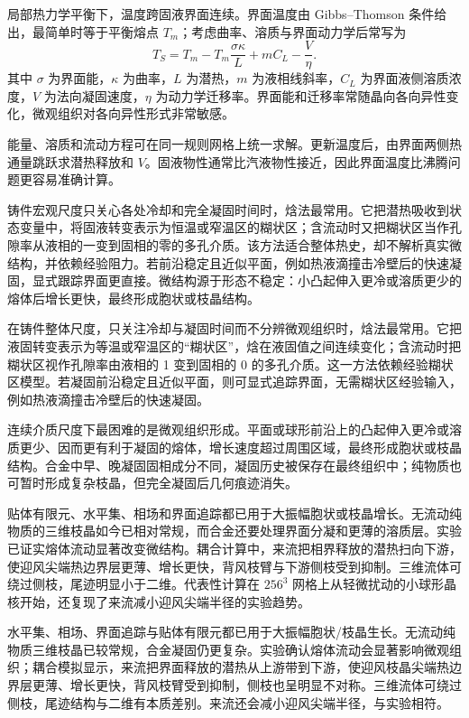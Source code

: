 \documentclass[11pt,a4paper,openany,fontset=none]{ctexbook}
\begin{document}
局部热力学平衡下，温度跨固液界面连续。界面温度由 Gibbs--Thomson 条件给出，最简单时等于平衡熔点 $T_m$；考虑曲率、溶质与界面动力学后常写为
\begin{equation}
 T_S=T_m-T_m\frac{\sigma\kappa}{L}+mC_L-\frac{V}{\eta}. \tag{11.19}
\end{equation}
其中 $\sigma$ 为界面能，$\kappa$ 为曲率，$L$ 为潜热，$m$ 为液相线斜率，$C_L$ 为界面液侧溶质浓度，$V$ 为法向凝固速度，$\eta$ 为动力学迁移率。界面能和迁移率常随晶向各向异性变化，微观组织对各向异性形式非常敏感。

能量、溶质和流动方程可在同一规则网格上统一求解。更新温度后，由界面两侧热通量跳跃求潜热释放和 $V$。固液物性通常比汽液物性接近，因此界面温度比沸腾问题更容易准确计算。

铸件宏观尺度只关心各处冷却和完全凝固时间时，焓法最常用。它把潜热吸收到状态变量中，将固液转变表示为恒温或窄温区的糊状区；含流动时又把糊状区当作孔隙率从液相的一变到固相的零的多孔介质。该方法适合整体热史，却不解析真实微结构，并依赖经验阻力。若前沿稳定且近似平面，例如热液滴撞击冷壁后的快速凝固，显式跟踪界面更直接。微结构源于形态不稳定：小凸起伸入更冷或溶质更少的熔体后增长更快，最终形成胞状或枝晶结构。

在铸件整体尺度，只关注冷却与凝固时间而不分辨微观组织时，焓法最常用。它把液固转变表示为等温或窄温区的“糊状区”，焓在液固值之间连续变化；含流动时把糊状区视作孔隙率由液相的 1 变到固相的 0 的多孔介质。这一方法依赖经验糊状区模型。若凝固前沿稳定且近似平面，则可显式追踪界面，无需糊状区经验输入，例如热液滴撞击冷壁后的快速凝固。

连续介质尺度下最困难的是微观组织形成。平面或球形前沿上的凸起伸入更冷或溶质更少、因而更有利于凝固的熔体，增长速度超过周围区域，最终形成胞状或枝晶结构。合金中早、晚凝固固相成分不同，凝固历史被保存在最终组织中；纯物质也可暂时形成复杂枝晶，但完全凝固后几何痕迹消失。

贴体有限元、水平集、相场和界面追踪都已用于大振幅胞状或枝晶增长。无流动纯物质的三维枝晶如今已相对常规，而合金还要处理界面分凝和更薄的溶质层。实验已证实熔体流动显著改变微结构。耦合计算中，来流把相界释放的潜热扫向下游，使迎风尖端热边界层更薄、增长更快，背风枝臂与下游侧枝受到抑制。三维流体可绕过侧枝，尾迹明显小于二维。代表性计算在 $256^3$ 网格上从轻微扰动的小球形晶核开始，还复现了来流减小迎风尖端半径的实验趋势。

水平集、相场、界面追踪与贴体有限元都已用于大振幅胞状/枝晶生长。无流动纯物质三维枝晶已较常规，合金凝固仍更复杂。实验确认熔体流动会显著影响微观组织；耦合模拟显示，来流把界面释放的潜热从上游带到下游，使迎风枝晶尖端热边界层更薄、增长更快，背风枝臂受到抑制，侧枝也呈明显不对称。三维流体可绕过侧枝，尾迹结构与二维有本质差别。来流还会减小迎风尖端半径，与实验相符。
\end{document}
